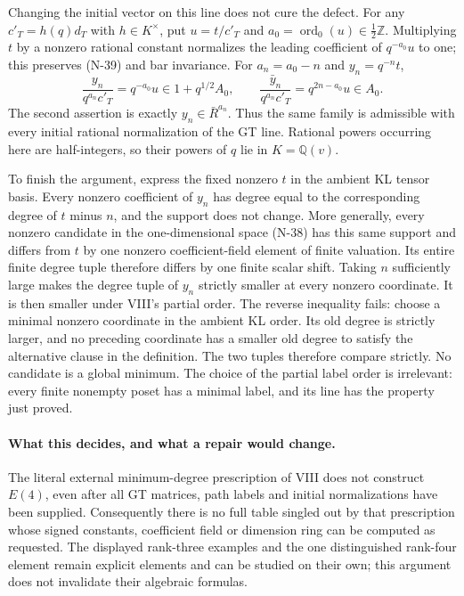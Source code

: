 Changing the initial vector on this line does not cure the defect.
For any $c'_T=h(q)d_T$ with $h\in K^\times$, put
$u=t/c'_T$ and $a_0=\operatorname{ord}_0(u)\in\tfrac12\mathbb Z$.
Multiplying $t$ by a nonzero rational constant normalizes the leading
coefficient of $q^{-a_0}u$ to one; this preserves (N-39) and bar
invariance.  For $a_n=a_0-n$ and $y_n=q^{-n}t$,
\[
 \frac{y_n}{q^{a_n}c'_T}=q^{-a_0}u\in1+q^{1/2}A_0,
 \qquad
 \frac{\bar y_n}{q^{a_n}c'_T}=q^{2n-a_0}u\in A_0.
 \tag{N-43}
\]
The second assertion is exactly $y_n\in\bar R^{a_n}$.
Thus the same family is admissible with every initial rational
normalization of the GT line.  Rational powers occurring here are
half-integers, so their powers of $q$ lie in $K=\mathbb Q(v)$.

To finish the argument, express the fixed nonzero $t$ in the ambient
KL tensor basis.  Every nonzero coefficient of $y_n$ has degree
equal to the corresponding degree of $t$ minus $n$, and the support
does not change.  More generally, every nonzero candidate in the
one-dimensional space (N-38) has this same support and differs from
$t$ by one nonzero coefficient-field element of finite valuation.  Its entire finite degree
tuple therefore differs by one finite scalar shift.  Taking $n$
sufficiently large makes the degree tuple of $y_n$ strictly smaller
at every nonzero coordinate.  It is then smaller under VIII's
partial order.  The reverse inequality fails: choose a minimal
nonzero coordinate in the ambient KL order.  Its old degree is
strictly larger, and no preceding coordinate has a smaller old
degree to satisfy the alternative clause in the definition.
The two tuples therefore compare strictly.  No candidate is a
global minimum.  The choice of the partial label order is irrelevant:
every finite nonempty poset has a minimal label, and its line has
the property just proved.

\paragraph{What this decides, and what a repair would change.}
The literal external minimum-degree prescription of VIII does not
construct $E(4)$, even after all GT matrices, path labels and initial
normalizations have been supplied.  Consequently there is no full
table singled out by that prescription whose signed constants,
coefficient field or dimension ring can be computed as requested.
The displayed rank-three examples and the one distinguished
rank-four element remain explicit elements and can be studied on
their own; this argument does not invalidate their algebraic formulas.

